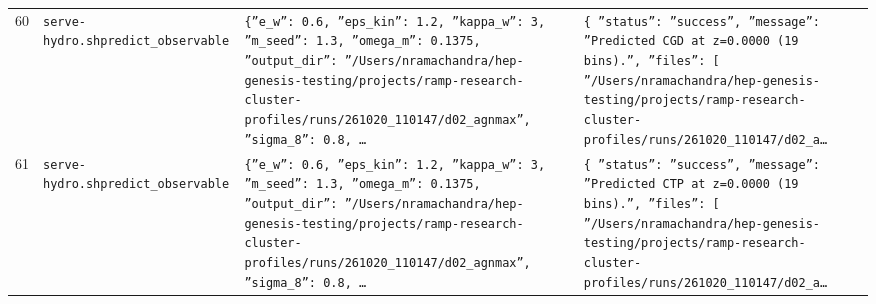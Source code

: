 \documentclass[11pt,a4paper]{article}
\begin{document}
\begin{longtable}{@{}p{}p{}p{}p{}@{}}
60 & \texttt{serve-hydro.sh}\newline\texttt{predict\_\allowbreak{}observable} & \texttt{\{''e\_\allowbreak{}w'':\allowbreak{} 0.6,\allowbreak{} ''eps\_\allowbreak{}kin'':\allowbreak{} 1.2,\allowbreak{} ''kappa\_\allowbreak{}w'':\allowbreak{} 3,\allowbreak{} ''m\_\allowbreak{}seed'':\allowbreak{} 1.3,\allowbreak{} ''omega\_\allowbreak{}m'':\allowbreak{} 0.1375,\allowbreak{} ''output\_\allowbreak{}dir'':\allowbreak{} ''/\allowbreak{}Users/\allowbreak{}nramachandra/\allowbreak{}hep-genesis-testing/\allowbreak{}projects/\allowbreak{}ramp-research-cluster-profiles/\allowbreak{}runs/\allowbreak{}261020\_\allowbreak{}110147/\allowbreak{}d02\_\allowbreak{}agnmax'',\allowbreak{} ''sigma\_\allowbreak{}8'':\allowbreak{} 0.8,\allowbreak{} \ldots{}\allowbreak{}} & \texttt{\{   ''status'':\allowbreak{} ''success'',\allowbreak{}   ''message'':\allowbreak{} ''Predicted CGD at z=\allowbreak{}0.0000 (19 bins)\allowbreak{}.'',\allowbreak{}   ''files'':\allowbreak{} [     ''/\allowbreak{}Users/\allowbreak{}nramachandra/\allowbreak{}hep-genesis-testing/\allowbreak{}projects/\allowbreak{}ramp-research-cluster-profiles/\allowbreak{}runs/\allowbreak{}261020\_\allowbreak{}110147/\allowbreak{}d02\_\allowbreak{}a\ldots{}\allowbreak{}} \\
61 & \texttt{serve-hydro.sh}\newline\texttt{predict\_\allowbreak{}observable} & \texttt{\{''e\_\allowbreak{}w'':\allowbreak{} 0.6,\allowbreak{} ''eps\_\allowbreak{}kin'':\allowbreak{} 1.2,\allowbreak{} ''kappa\_\allowbreak{}w'':\allowbreak{} 3,\allowbreak{} ''m\_\allowbreak{}seed'':\allowbreak{} 1.3,\allowbreak{} ''omega\_\allowbreak{}m'':\allowbreak{} 0.1375,\allowbreak{} ''output\_\allowbreak{}dir'':\allowbreak{} ''/\allowbreak{}Users/\allowbreak{}nramachandra/\allowbreak{}hep-genesis-testing/\allowbreak{}projects/\allowbreak{}ramp-research-cluster-profiles/\allowbreak{}runs/\allowbreak{}261020\_\allowbreak{}110147/\allowbreak{}d02\_\allowbreak{}agnmax'',\allowbreak{} ''sigma\_\allowbreak{}8'':\allowbreak{} 0.8,\allowbreak{} \ldots{}\allowbreak{}} & \texttt{\{   ''status'':\allowbreak{} ''success'',\allowbreak{}   ''message'':\allowbreak{} ''Predicted CTP at z=\allowbreak{}0.0000 (19 bins)\allowbreak{}.'',\allowbreak{}   ''files'':\allowbreak{} [     ''/\allowbreak{}Users/\allowbreak{}nramachandra/\allowbreak{}hep-genesis-testing/\allowbreak{}projects/\allowbreak{}ramp-research-cluster-profiles/\allowbreak{}runs/\allowbreak{}261020\_\allowbreak{}110147/\allowbreak{}d02\_\allowbreak{}a\ldots{}\allowbreak{}} \\

\end{longtable}
\end{document}
